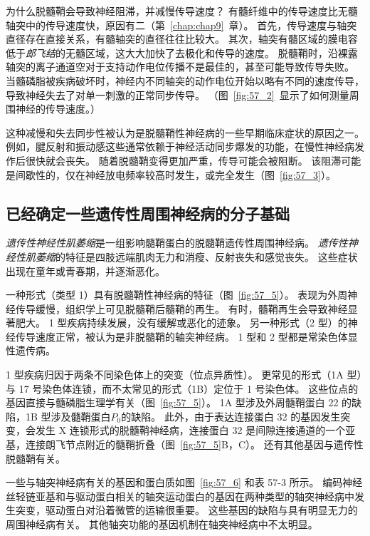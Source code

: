 为什么脱髓鞘会导致神经阻滞，并减慢传导速度？
有髓纤维中的传导速度比无髓轴突中的传导速度快，原因有二（第~\ref{chap:chap9}~章）。
首先，传导速度与轴突直径存在直接关系，有髓轴突的直径往往比较大。
其次，轴突有髓区域的膜电容低于\textit{郎飞结}的无髓区域，这大大加快了去极化和传导的速度。
脱髓鞘时，沿裸露轴突的离子通道空对于支持动作电位传播不是最佳的，甚至可能导致传导失败。
当髓磷脂被疾病破坏时，神经内不同轴突的动作电位开始以略有不同的速度传导，导致神经失去了对单一刺激的正常同步传导。
（图~\ref{fig:57_2}~显示了如何测量周围神经的传导速度。）


这种减慢和失去同步性被认为是脱髓鞘性神经病的一些早期临床症状的原因之一。
例如，腱反射和振动感这些通常依赖于神经活动同步爆发的功能，在慢性神经病发作后很快就会丧失。
随着脱髓鞘变得更加严重，传导可能会被阻断。
该阻滞可能是间歇性的，仅在神经放电频率较高时发生，或完全发生（图~\ref{fig:57_3}）。



\subsection{已经确定一些遗传性周围神经病的分子基础}

\textit{遗传性神经性肌萎缩}是一组影响髓鞘蛋白的脱髓鞘遗传性周围神经病。
\textit{遗传性神经性肌萎缩}的特征是四肢远端肌肉无力和消瘦、反射丧失和感觉丧失。
这些症状出现在童年或青春期，并逐渐恶化。


一种形式（类型 1）具有脱髓鞘性神经病的特征（图~\ref{fig:57_5}）。
表现为外周神经传导缓慢，组织学上可见脱髓鞘后髓鞘的再生。
有时，髓鞘再生会导致神经显著肥大。
1 型疾病持续发展，没有缓解或恶化的迹象。
另一种形式（2 型）的神经传导速度正常，被认为是非脱髓鞘的轴突神经病。
1 型和 2 型都是常染色体显性遗传病。


1 型疾病归因于两条不同染色体上的突变（位点异质性）。
更常见的形式（1A 型）与 17 号染色体连锁，而不太常见的形式（1B）定位于 1 号染色体。
这些位点的基因直接与髓磷脂生理学有关（图~\ref{fig:57_5}）。
1A 型涉及外周髓鞘蛋白 22 的缺陷，1B 型涉及髓鞘蛋白$P_0$的缺陷。
此外，由于表达连接蛋白 32 的基因发生突变，会发生 X 连锁形式的脱髓鞘神经病，连接蛋白 32 是间隙连接通道的一个亚基，连接朗飞节点附近的髓鞘折叠（图~\ref{fig:57_5}B，C）。
还有其他基因与遗传性脱髓鞘有关。


一些与轴突神经病有关的基因和蛋白质如图~\ref{fig:57_6} 和表 57-3 所示。
编码神经丝轻链亚基和与驱动蛋白相关的轴突运动蛋白的基因在两种类型的轴突神经病中发生突变，驱动蛋白对沿着微管的运输很重要。
这些基因的缺陷与具有明显无力的周围神经病有关。
其他轴突功能的基因机制在轴突神经病中不太明显。


